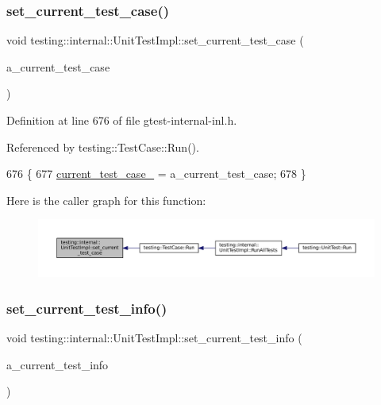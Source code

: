 \subsubsection{\texorpdfstring{set\+\_\+current\+\_\+test\+\_\+case()}{set\_current\_test\_case()}}
{\footnotesize\ttfamily void testing\+::internal\+::\+Unit\+Test\+Impl\+::set\+\_\+current\+\_\+test\+\_\+case (\begin{DoxyParamCaption}\item[{\hyperlink{classtesting_1_1TestCase}{Test\+Case} $\ast$}]{a\+\_\+current\+\_\+test\+\_\+case }\end{DoxyParamCaption})\hspace{0.3cm}{\ttfamily [inline]}}



Definition at line 676 of file gtest-\/internal-\/inl.\+h.



Referenced by testing\+::\+Test\+Case\+::\+Run().


\begin{DoxyCode}
676                                                             \{
677     \hyperlink{classtesting_1_1internal_1_1UnitTestImpl_a3b346729d3940f065e05c69c434ebb3f}{current\_test\_case\_} = a\_current\_test\_case;
678   \}
\end{DoxyCode}
Here is the caller graph for this function\+:
\nopagebreak
\begin{figure}[H]
\begin{center}
\leavevmode
\includegraphics[width=350pt]{classtesting_1_1internal_1_1UnitTestImpl_a7f0e79bdabd28819cc857e316a36a350_icgraph}
\end{center}
\end{figure}
\mbox{\label{classtesting_1_1internal_1_1UnitTestImpl_ab72211c99ce4427dfb472d6ecea62989}} 
\subsubsection{\texorpdfstring{set\+\_\+current\+\_\+test\+\_\+info()}{set\_current\_test\_info()}}
{\footnotesize\ttfamily void testing\+::internal\+::\+Unit\+Test\+Impl\+::set\+\_\+current\+\_\+test\+\_\+info (\begin{DoxyParamCaption}\item[{\hyperlink{classtesting_1_1TestInfo}{Test\+Info} $\ast$}]{a\+\_\+current\+\_\+test\+\_\+info }\end{DoxyParamCaption})\hspace{0.3cm}{\ttfamily [inline]}}




